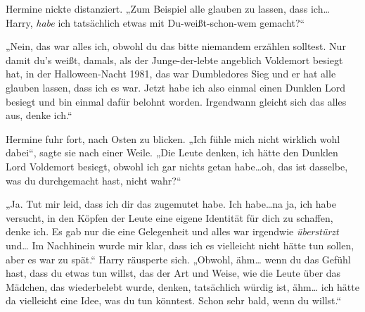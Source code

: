 Hermine nickte distanziert. „Zum Beispiel alle glauben zu lassen, dass ich… Harry, \emph{habe} ich tatsächlich etwas mit Du-weißt-schon-wem gemacht?“

„Nein, das war alles ich, obwohl du das bitte niemandem erzählen solltest. Nur damit du’s weißt, damals, als der Junge-der-lebte angeblich Voldemort besiegt hat, in der Halloween-Nacht 1981, das war Dumbledores Sieg und er hat alle glauben lassen, dass ich es war. Jetzt habe ich also einmal einen Dunklen Lord besiegt und bin einmal dafür belohnt worden. Irgendwann gleicht sich das alles aus, denke ich.“

Hermine fuhr fort, nach Osten zu blicken.
„Ich fühle mich nicht wirklich wohl dabei“, sagte sie nach einer Weile. „Die Leute denken, ich hätte den Dunklen Lord Voldemort besiegt, obwohl ich gar nichts getan habe…oh, das ist dasselbe, was du durchgemacht hast, nicht wahr?“

„Ja. Tut mir leid, dass ich dir das zugemutet habe. Ich habe…na ja, ich habe versucht, in den Köpfen der Leute eine eigene Identität für dich zu schaffen, denke ich. Es gab nur die eine Gelegenheit und alles war irgendwie \emph{überstürzt} und… Im Nachhinein wurde mir klar, dass ich es vielleicht nicht hätte tun sollen, aber es war zu spät.“ Harry räusperte sich. „Obwohl, ähm… wenn du das Gefühl hast, dass du etwas tun willst, das der Art und Weise, wie die Leute über das Mädchen, das wiederbelebt wurde, denken, tatsächlich würdig ist, ähm… ich hätte da vielleicht eine Idee, was du tun könntest. Schon sehr bald, wenn du willst.“

